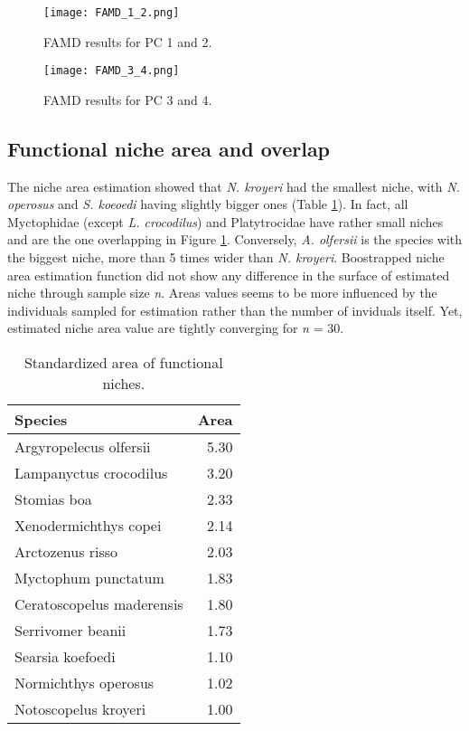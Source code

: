 \begin{figure} [!htbp]
	\begin{center}
		\texttt{[image: FAMD\_1\_2.png]}
	\end{center}
	\caption{FAMD results for PC 1 and 2.}
	\label{fig:famd12}
\end{figure}

\begin{figure} [!htbp]
	\begin{center}
		\texttt{[image: FAMD\_3\_4.png]}
	\end{center}
	\caption{FAMD results for PC 3 and 4.}
	\label{fig:famd34}
\end{figure}


\subsection{Functional niche area and overlap}
The niche area estimation showed that \textit{N. kroyeri} had the smallest niche, with \textit{N. operosus} and \textit{S. koeoedi} having slightly bigger ones (Table \ref{table:sp_area}). In fact, all Myctophidae (except \textit{L. crocodilus}) and Platytrocidae have rather small niches and are the one overlapping in Figure \ref{fig:famd12}. Conversely, \textit{A. olfersii} is the species with the biggest niche, more than 5 times wider than \textit{N. kroyeri}.
Boostrapped niche area estimation function did not show any difference in the surface of estimated niche through sample size \textit{n}. Areas values seems to be more influenced by the individuals sampled for estimation rather than the number of inviduals itself. Yet, estimated niche area value are tightly converging for \textit{n} = 30. 

\begin{table}[ht]
\centering
\caption{Standardized area of functional niches.}
\label{table:sp_area}
\begin{adjustbox}{max width=1.1\textwidth,center}
\begin{tabular}{lr}
  \hline
Species & Area \\ 
  \hline
Argyropelecus olfersii & 5.30 \\ 
  Lampanyctus crocodilus & 3.20 \\ 
  Stomias boa & 2.33 \\ 
  Xenodermichthys copei & 2.14 \\ 
  Arctozenus risso & 2.03 \\ 
  Myctophum punctatum & 1.83 \\ 
  Ceratoscopelus maderensis & 1.80 \\ 
  Serrivomer beanii & 1.73 \\ 
  Searsia koefoedi & 1.10 \\ 
  Normichthys operosus & 1.02 \\ 
  Notoscopelus kroyeri & 1.00 \\ 
   \hline
\end{tabular}
\end{adjustbox}
\end{table}


